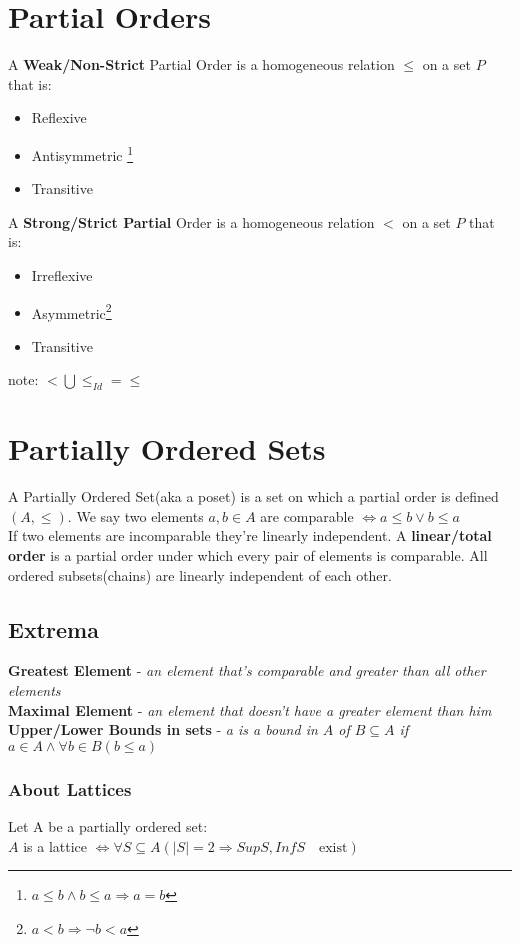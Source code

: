 \documentclass{article}
\begin{document}
\newpage

\section{Partial Orders}
A \textbf{Weak/Non-Strict} Partial Order is a homogeneous relation $\le$ on a set $P$ that is:
\begin{itemize}
\item Reflexive
\item Antisymmetric \footnote[1]{$a\le b \land b\le a \Rightarrow a=b$}
\item Transitive
\end{itemize}
A \textbf{Strong/Strict Partial} Order is a homogeneous relation $<$ on a set $P$ that is:
\begin{itemize}
\item Irreflexive
\item Asymmetric\footnote[2]{$a<b \Rightarrow \lnot b<a$}
\item Transitive
\end{itemize}
note: $<\bigcup\le_{Id}=\le$
\section{Partially Ordered Sets}
A Partially Ordered Set(aka a poset) is a set on which a partial order is defined $(A,\le).$ We say
two elements $a,b\in A$ are comparable $\iff a\le b\lor b\le a$\\
If two elements are incomparable they're linearly independent.
A \textbf{linear/total order} is a partial order under which every pair of elements is comparable. All ordered subsets(chains) are linearly independent of each other.
\subsection{Extrema}
\textbf{Greatest Element} - \emph{an element that's comparable and greater than all other elements}\\
\textbf{Maximal Element} - \emph{an element that doesn't have a greater element than him}\\
\textbf{Upper/Lower Bounds in sets} - \emph{a is a bound in $A$ of $B\subseteq A$ if $a\in A \land \forall b\in B(b\le a)$}
\subsubsection{About Lattices}
Let A be a partially ordered set:\\
    $A$ is a lattice $\iff \forall S\subseteq A(|S|=2 \Rightarrow SupS,InfS \quad\text{exist})$
    
\end{document}
